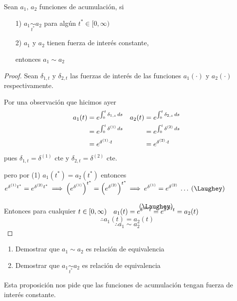 \begin{proposition}
Sean $a_1, \, a_2$ funciones de acumulación, si 
\begin{enumerate}
\item[1)] $a_1 \underset{t^{*}}{\sim} a_2$ para algún $t^{*} \in [0, \infty)$
\item[2)] $a_1$ y $a_2$ tienen fuerza de interés constante, 

entonces $a_1 \sim a_2$
\end{enumerate}
\end{proposition}
\begin{proof}
Sean $\delta_{1,t}$ y $\delta_{2,t}$ las fuerzas de interés de las funciones $a_1(\cdot)$ y $a_2(\cdot)$ respectivamente.

Por una observación que hicimos ayer
\begin{align*}
a_1(t) &= e^{\int_{0}^{t} \delta_{1,s} \, ds} & a_2(t) &= e^{\int_{0}^{t} \delta_{2,s} \, ds}\\
&= e^{\int_{0}^{t} \delta^{(1)} \, ds}   &&= e^{\int_{0}^{t} \delta^{(2)} \, ds}\\
&= e^{\delta^{(1)}\cdot t}   &&= e^{\delta^{(2)}\cdot t}
\end{align*}
pues $\delta_{1,t} = \delta^{(1)}$ cte y $\delta_{2,t} = \delta^{(2)}$ cte.

pero por (1) $a_1(t^{*}) = a_2(t^{*})$ entonces $e^{\delta^{(1)}t^{*}} = e^{\delta^{(2)}t^{*}}\:
\Longrightarrow \: \left( e^{\delta^{(1)}}\right) ^{t^*} = \left( e^{\delta^{(2)}}\right) ^{t^*} \\ \Longrightarrow \: e^{\delta^{(1)}} = e^{\delta^{(2)}}\: \ldots \: (\Laughey)$

Entonces para cualquier $t\in [0,\infty) \quad a_1(t) = e^{\delta^{(1)}t} \stackrel{\mathclap{\normalfont\mbox{(\Laughey)}}}{=} e^{\delta^{(2)}t} = a_2(t)$
$$\: \therefore a_1(t) = a_2(t)$$
$$\: \therefore a_1 \sim a_2$$
\end{proof}

\textcolor{red}{}
\begin{enumerate}
\color{red}\item Demostrar que $a_1 \sim a_2$ es relación de equivalencia
\color{red}\item Demostrar que $a_1 \underset{t^{*}}{\sim} a_2$ es relación de equivalencia
\end{enumerate}

Esta proposición nos pide que las funciones de acumulación tengan fuerza de interés constante.

